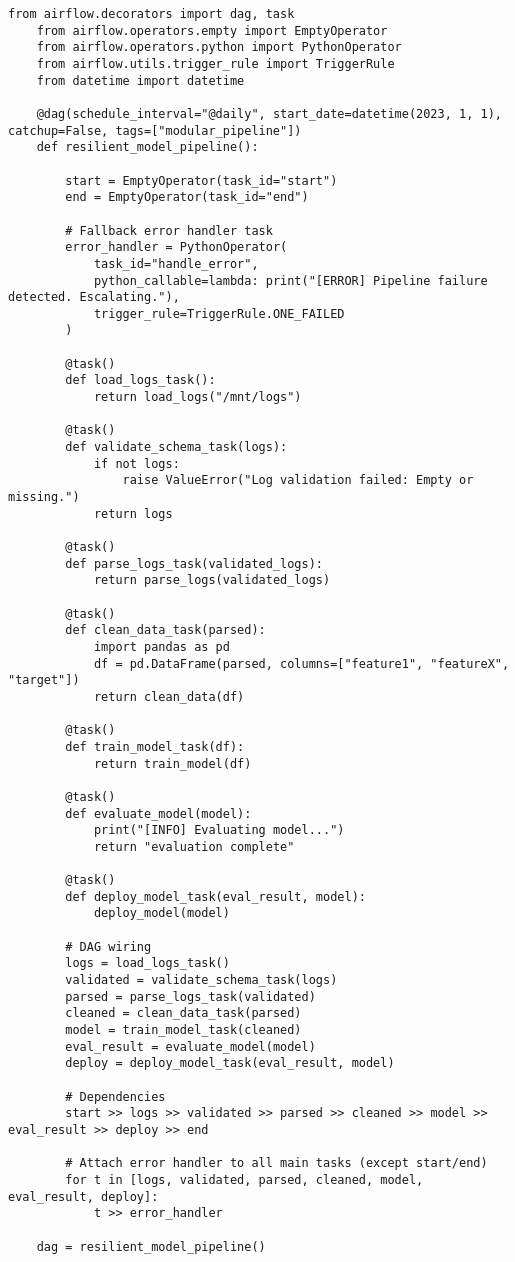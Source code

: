 \begin{lstlisting}[caption={Airflow DAG with linear tasks and error handling flow.}, label={lst:airflowdag_error_handling}]
    from airflow.decorators import dag, task
    from airflow.operators.empty import EmptyOperator
    from airflow.operators.python import PythonOperator
    from airflow.utils.trigger_rule import TriggerRule
    from datetime import datetime
    
    @dag(schedule_interval="@daily", start_date=datetime(2023, 1, 1), catchup=False, tags=["modular_pipeline"])
    def resilient_model_pipeline():
    
        start = EmptyOperator(task_id="start")
        end = EmptyOperator(task_id="end")
    
        # Fallback error handler task
        error_handler = PythonOperator(
            task_id="handle_error",
            python_callable=lambda: print("[ERROR] Pipeline failure detected. Escalating."),
            trigger_rule=TriggerRule.ONE_FAILED
        )
    
        @task()
        def load_logs_task():
            return load_logs("/mnt/logs")
    
        @task()
        def validate_schema_task(logs):
            if not logs:
                raise ValueError("Log validation failed: Empty or missing.")
            return logs
    
        @task()
        def parse_logs_task(validated_logs):
            return parse_logs(validated_logs)
    
        @task()
        def clean_data_task(parsed):
            import pandas as pd
            df = pd.DataFrame(parsed, columns=["feature1", "featureX", "target"])
            return clean_data(df)
    
        @task()
        def train_model_task(df):
            return train_model(df)
    
        @task()
        def evaluate_model(model):
            print("[INFO] Evaluating model...")
            return "evaluation complete"
    
        @task()
        def deploy_model_task(eval_result, model):
            deploy_model(model)
    
        # DAG wiring
        logs = load_logs_task()
        validated = validate_schema_task(logs)
        parsed = parse_logs_task(validated)
        cleaned = clean_data_task(parsed)
        model = train_model_task(cleaned)
        eval_result = evaluate_model(model)
        deploy = deploy_model_task(eval_result, model)
    
        # Dependencies
        start >> logs >> validated >> parsed >> cleaned >> model >> eval_result >> deploy >> end
    
        # Attach error handler to all main tasks (except start/end)
        for t in [logs, validated, parsed, cleaned, model, eval_result, deploy]:
            t >> error_handler
    
    dag = resilient_model_pipeline()
    \end{lstlisting}






